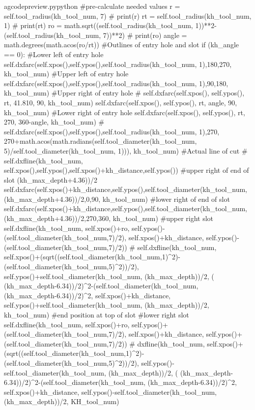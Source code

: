 \documentclass{ltxdoc}
\begin{document}
\lstset{firstnumber=\thegcpy}
\begin{writecode}{a}{gcodepreview.py}{python}
#pre-calculate needed values
        r = self.tool_radius(kh_tool_num, 7)
#        print(r)
        rt = self.tool_radius(kh_tool_num, 1)
#        print(rt)
        ro = math.sqrt((self.tool_radius(kh_tool_num, 1))**2-(self.tool_radius(kh_tool_num, 7))**2)
#        print(ro)
        angle = math.degrees(math.acos(ro/rt))
#Outlines of entry hole and slot
        if (kh_angle == 0):
#Lower left of entry hole
            self.dxfarc(self.xpos(),self.ypos(),self.tool_radius(kh_tool_num, 1),180,270, kh_tool_num)
#Upper left of entry hole
            self.dxfarc(self.xpos(),self.ypos(),self.tool_radius(kh_tool_num, 1),90,180, kh_tool_num)
#Upper right of entry hole
#            self.dxfarc(self.xpos(), self.ypos(), rt, 41.810, 90, kh_tool_num)
            self.dxfarc(self.xpos(), self.ypos(), rt, angle, 90, kh_tool_num)
#Lower right of entry hole
            self.dxfarc(self.xpos(), self.ypos(), rt, 270, 360-angle, kh_tool_num)
#            self.dxfarc(self.xpos(),self.ypos(),self.tool_radius(kh_tool_num, 1),270, 270+math.acos(math.radians(self.tool_diameter(kh_tool_num, 5)/self.tool_diameter(kh_tool_num, 1))), kh_tool_num)
#Actual line of cut
#            self.dxfline(kh_tool_num, self.xpos(),self.ypos(),self.xpos()+kh_distance,self.ypos())
#upper right of end of slot (kh_max_depth+4.36))/2
            self.dxfarc(self.xpos()+kh_distance,self.ypos(),self.tool_diameter(kh_tool_num, (kh_max_depth+4.36))/2,0,90, kh_tool_num)
#lower right of end of slot
            self.dxfarc(self.xpos()+kh_distance,self.ypos(),self.tool_diameter(kh_tool_num, (kh_max_depth+4.36))/2,270,360, kh_tool_num)
#upper right slot
            self.dxfline(kh_tool_num, self.xpos()+ro, self.ypos()-(self.tool_diameter(kh_tool_num,7)/2), self.xpos()+kh_distance, self.ypos()-(self.tool_diameter(kh_tool_num,7)/2))
#            self.dxfline(kh_tool_num, self.xpos()+(sqrt((self.tool_diameter(kh_tool_num,1)^2)-(self.tool_diameter(kh_tool_num,5)^2))/2), self.ypos()+self.tool_diameter(kh_tool_num, (kh_max_depth))/2, ( (kh_max_depth-6.34))/2)^2-(self.tool_diameter(kh_tool_num, (kh_max_depth-6.34))/2)^2, self.xpos()+kh_distance, self.ypos()+self.tool_diameter(kh_tool_num, (kh_max_depth))/2, kh_tool_num)
#end position at top of slot
#lower right slot
            self.dxfline(kh_tool_num, self.xpos()+ro, self.ypos()+(self.tool_diameter(kh_tool_num,7)/2), self.xpos()+kh_distance, self.ypos()+(self.tool_diameter(kh_tool_num,7)/2))
#        dxfline(kh_tool_num, self.xpos()+(sqrt((self.tool_diameter(kh_tool_num,1)^2)-(self.tool_diameter(kh_tool_num,5)^2))/2), self.ypos()-self.tool_diameter(kh_tool_num, (kh_max_depth))/2, ( (kh_max_depth-6.34))/2)^2-(self.tool_diameter(kh_tool_num, (kh_max_depth-6.34))/2)^2, self.xpos()+kh_distance, self.ypos()-self.tool_diameter(kh_tool_num, (kh_max_depth))/2, KH_tool_num)

\end{writecode}
\end{document}
